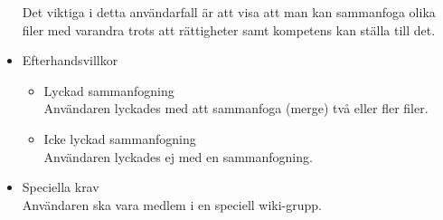 \begin{itemize}
	Det viktiga i detta användarfall är att visa att man kan sammanfoga olika filer med varandra trots att rättigheter samt kompetens kan ställa till det.
	\item Efterhandsvillkor
		\begin{itemize}	
		\item Lyckad sammanfogning
		\\Användaren lyckades med att sammanfoga (merge) två eller fler filer.
		\item Icke lyckad sammanfogning
		\\Användaren lyckades ej med en sammanfogning.
		\end{itemize}
	\item Speciella krav
	\\Användaren ska vara medlem i en speciell wiki-grupp.
\end{itemize}

